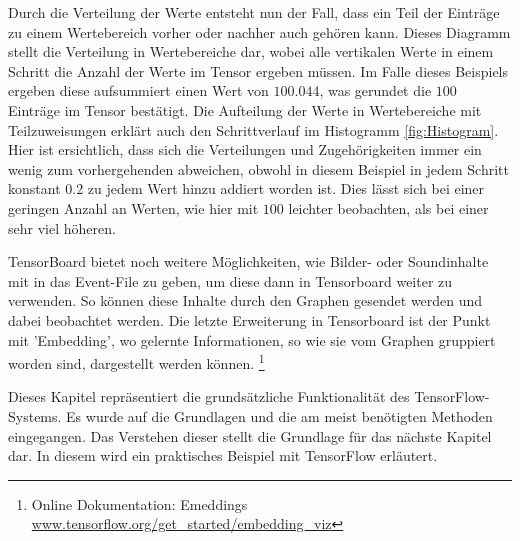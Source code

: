 Durch die Verteilung der Werte entsteht nun der Fall, dass ein Teil der Einträge zu einem Wertebereich vorher oder nachher auch gehören kann. 
Dieses Diagramm stellt die Verteilung in Wertebereiche dar, wobei alle vertikalen Werte in einem Schritt die Anzahl der Werte im Tensor ergeben müssen. 
Im Falle dieses Beispiels ergeben diese aufsummiert einen Wert von $100.044$, was gerundet die $100$ Einträge im Tensor bestätigt. 
Die Aufteilung der Werte in Wertebereiche mit Teilzuweisungen erklärt auch den Schrittverlauf im Histogramm \ref{fig:Histogram}. 
Hier ist ersichtlich, dass sich die Verteilungen und Zugehörigkeiten immer ein wenig zum vorhergehenden abweichen, obwohl in diesem Beispiel in jedem Schritt konstant $0.2$ zu jedem Wert hinzu addiert worden ist. 
Dies lässt sich bei einer geringen Anzahl an Werten, wie hier mit $100$ leichter beobachten, als bei einer sehr viel höheren. 
\phantom \newline

\noindent
TensorBoard bietet noch weitere Möglichkeiten, wie Bilder- oder Soundinhalte mit in das Event-File zu geben, um diese dann in Tensorboard weiter zu verwenden. 
So können diese Inhalte durch den Graphen gesendet werden und dabei beobachtet werden. 
Die letzte Erweiterung in Tensorboard ist der Punkt mit 'Embedding', wo gelernte Informationen, so wie sie vom Graphen gruppiert worden sind, dargestellt werden können. \footnote{Online Dokumentation: Emeddings \url{www.tensorflow.org/get_started/embedding_viz}}
\phantom \newline

\noindent
Dieses Kapitel repräsentiert die grundsätzliche Funktionalität des TensorFlow-Systems. 
Es wurde auf die Grundlagen und die am meist benötigten Methoden eingegangen. 
Das Verstehen dieser stellt die Grundlage für das nächste Kapitel dar. 
In diesem wird ein praktisches Beispiel mit TensorFlow erläutert. 









